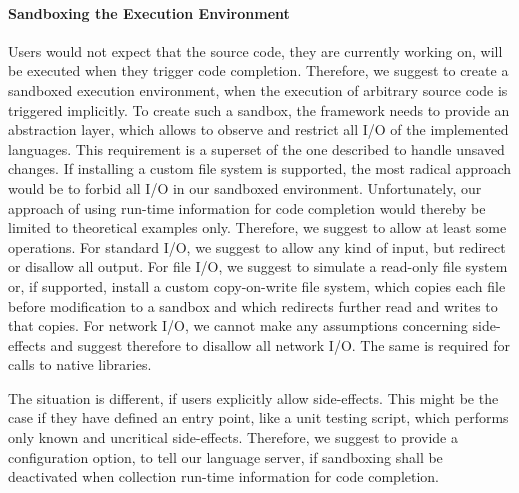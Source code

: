 \documentclass[sigplan,10pt,review,anonymous]{acmart}
\begin{document}
    \paragraph{Sandboxing the Execution Environment}
    Users would not expect that the source code, they are currently working on, will be executed when they trigger code completion. Therefore, we suggest to create a sandboxed execution environment, when the execution of arbitrary source code is triggered implicitly. To create such a sandbox, the framework needs to provide an abstraction layer, which allows to observe and restrict all I/O of the implemented languages. This requirement is a superset of the one described to handle unsaved changes. If installing a custom file system is supported, the most radical approach would be to forbid all I/O in our sandboxed environment. Unfortunately, our approach of using run-time information for code completion would thereby be limited to theoretical examples only. Therefore, we suggest to allow at least some operations. For standard I/O, we suggest to allow any kind of input, but redirect or disallow all output. For file I/O, we suggest to simulate a read-only file system or, if supported, install a custom copy-on-write file system, which copies each file before modification to a sandbox and which redirects further read and writes to that copies. For network I/O, we cannot make any assumptions concerning side-effects and suggest therefore to disallow all network I/O. The same is required for calls to native libraries.
    
    The situation is different, if users explicitly allow side-effects. This might be the case if they have defined an entry point, like a unit testing script, which performs only known and uncritical side-effects. Therefore, we suggest to provide a configuration option, to tell our language server, if sandboxing shall be deactivated when collection run-time information for code completion.
\end{document}
